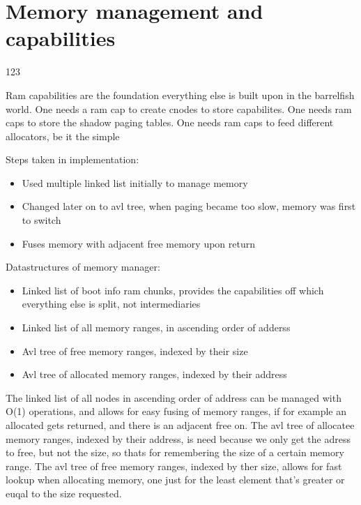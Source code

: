 \chapter{Memory management and capabilities}

123 \cite{aos-book}

Ram capabilities are the foundation everything else is built upon in the barrelfish world. One needs a ram cap to create cnodes to store capabilites. One needs ram caps to store the shadow paging tables. One needs ram caps to feed different allocators, be it the simple

Steps taken in implementation:
\begin{itemize}
	\item Used multiple linked list initially to manage memory
	\item Changed later on to avl tree, when paging became too slow, memory was first to switch
	\item Fuses memory with adjacent free memory upon return
\end{itemize}

Datastructures of memory manager:
\begin{itemize}
	\item Linked list of boot info ram chunks, provides the capabilities off which everything else is split, not intermediaries
	\item Linked list of all memory ranges, in ascending order of adderss
	\item Avl tree of free memory ranges, indexed by their size
	\item Avl tree of allocated memory ranges, indexed by their address
\end{itemize}

The linked list of all nodes in ascending order of address can be managed with O(1) operations, and allows for easy fusing of memory ranges, if for example an allocated gets returned, and there is an adjacent free on.
The avl tree of allocatee memory ranges, indexed by their address, is need because we only get the adress to free, but not the size, so thats for remembering the size of a certain memory range.
The avl tree of free memory ranges, indexed by ther size, allows for fast lookup when allocating memory, one just for the least element that's greater or euqal to the size requested.
